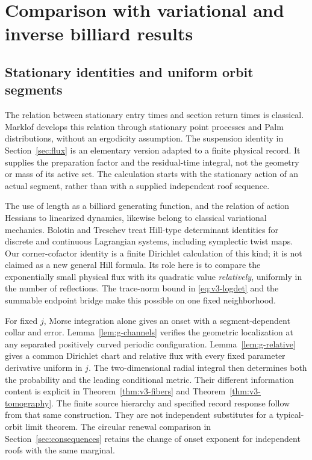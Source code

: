 \section{Comparison with variational and inverse billiard results}
\label{sec:comparison}
\subsection{Stationary identities and uniform orbit segments}
The relation between stationary entry times and section return times is
classical. Marklof \cite{Marklof} develops this relation through stationary
point processes and Palm distributions, without an ergodicity assumption.
The suspension identity in Section~\ref{sec:flux} is an elementary version
adapted to a finite physical record. It supplies the preparation factor
and the residual-time integral, not the geometry or mass of its active set.
The calculation starts with the stationary action of an actual segment,
rather than with a supplied independent roof sequence.

The use of length as a billiard generating function, and the relation of
action Hessians to linearized dynamics, likewise belong to classical
variational mechanics. Bolotin and Treschev \cite{Hill} treat Hill-type
determinant identities for discrete and continuous Lagrangian systems,
including symplectic twist maps. Our corner-cofactor identity is a finite
Dirichlet calculation of this kind; it is not claimed as a new general
Hill formula. Its role here is to compare the exponentially small physical
flux with its quadratic value \emph{relatively}, uniformly in the number
of reflections. The trace-norm bound in \eqref{eq:v3-logdet} and the summable
endpoint bridge make this possible on one fixed neighborhood.

For fixed $j$, Morse integration alone gives an onset with a
segment-dependent collar and error. Lemma~\ref{lem:g-channels}
verifies the geometric localization at any separated positively curved
periodic configuration. Lemma~\ref{lem:g-relative} gives a common
Dirichlet chart and relative flux with every fixed parameter derivative
uniform in $j$. The two-dimensional radial integral then determines
both the probability and the leading conditional metric. Their different
information content is explicit in Theorem~\ref{thm:v3-fibers} and
Theorem~\ref{thm:v3-tomography}. The finite source hierarchy and
specified record response follow from that same construction. They
are not independent substitutes for a typical-orbit limit theorem.
The circular renewal comparison in Section~\ref{sec:consequences}
retains the change of onset exponent for independent roofs with the
same marginal.

